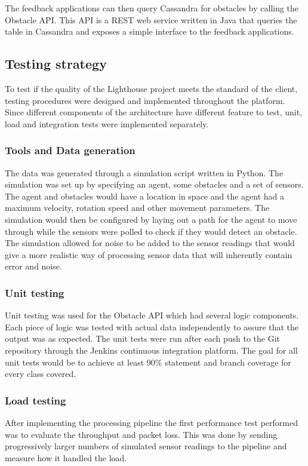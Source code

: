 \documentclass[prodmode,acmtosem]{acmsmall} %
\begin{document}
The feedback applications can then query Cassandra for obstacles by calling the Obstacle API. This API is a REST web service written in Java that queries the table in Cassandra and exposes a simple interface to the feedback applications.

\subsection{Testing strategy}
To test if the quality of the Lighthouse project meets the standard of the client, testing procedures were designed and implemented throughout the platform. Since different components of the architecture have different feature to test, unit, load and integration tests were implemented separately.

\subsubsection{Tools and Data generation}
The data was generated through a simulation script written in Python. The simulation was set up by specifying an agent, some obstacles and a set of sensors. The agent and obstacles would have a location in space and the agent had a maximum velocity, rotation speed and other movement parameters. The simulation would then be configured by laying out a path for the agent to move through while the sensors were polled to check if they would detect an obstacle. The simulation allowed for noise to be added to the sensor readings that would give a more realistic way of processing sensor data that will inherently contain error and noise.

\subsubsection{Unit testing}
\label{sec:unitTesting}
Unit testing was used for the Obstacle API which had several logic components. Each piece of logic was tested with actual data independently to assure that the output was as expected. The unit tests were run after each push to the Git repository through the Jenkins continuous integration platform. The goal for all unit tests would be to achieve at least 90\% statement and branch coverage for every class covered.

\subsubsection{Load testing}
After implementing the processing pipeline the first performance test performed was to evaluate the throughput and packet loss. This was done by sending progressively larger numbers of simulated sensor readings to the pipeline and measure how it handled the load.
\end{document}

